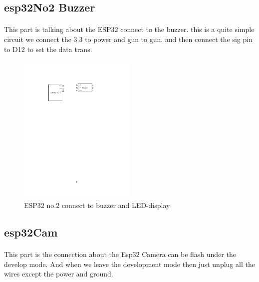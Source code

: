 \documentclass[a4paper, 12pt]{article}        %
\begin{document}
    \pagebreak
    \subsection{esp32No2 Buzzer}\label{subsec:esp32no2-buzzer}
    \paragraph{}
    This part is talking about the ESP32 connect to the buzzer.
    this is a quite simple circuit we connect the 3.3 to power and gun to gun.
    and then connect the sig pin to D12 to set the data trans.

    \blindtext{}



    \begin{figure}[h]
        \caption{ESP32 no.2 connect to buzzer and LED-display}\label{fig:figure3}
        \centering
        \includegraphics[width=0.5\textwidth]{../out/ESP32_No.2_connect_Buzzer}
    \end{figure}

    \pagebreak
    \subsection{esp32Cam}\label{subsec:esp32cam}
    \paragraph{}
    This part is the connection about the Esp32 Camera can be flash under the develop mode.
    And when we leave the development mode then just unplug all the wires except the power and ground.

    \blindtext{}
\end{document}
